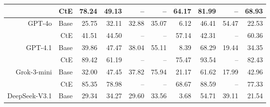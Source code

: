 \begin{table}[!t]
\begin{tabular}{r r !{\color{white!80!black} \vline} r r r r r !{\color{white!80!black} \vline} r r r}
 & CtE & \textcolor{blue!60!black}{78.24} & \textcolor{blue!60!black}{49.13} & \textcolor{blue!60!black}{--} & \textcolor{blue!60!black}{--} & \textcolor{blue!60!black}{64.17} & \textcolor{blue!60!black}{81.99} & \textcolor{blue!60!black}{--} & \textcolor{blue!60!black}{68.93} \\ \midrule
 \sf GPT-4o & Base & \textcolor{blue!60!black}{25.75} & \textcolor{blue!60!black}{32.11} & \textcolor{blue!60!black}{32.88} & \textcolor{blue!60!black}{35.07} & \textcolor{blue!60!black}{6.12} & \textcolor{blue!60!black}{46.41} & \textcolor{blue!60!black}{54.47} & \textcolor{blue!60!black}{22.53} \\
 & CtE & \textcolor{blue!60!black}{41.51} & \textcolor{blue!60!black}{44.50} & \textcolor{blue!60!black}{--} & \textcolor{blue!60!black}{--} & \textcolor{blue!60!black}{57.14} & \textcolor{blue!60!black}{42.31} & \textcolor{blue!60!black}{--} & \textcolor{blue!60!black}{60.36} \\ \midrule
 \sf GPT-4.1 & Base & \textcolor{blue!60!black}{39.86} & \textcolor{blue!60!black}{47.47} & \textcolor{blue!60!black}{38.04} & \textcolor{blue!60!black}{55.11} & \textcolor{blue!60!black}{8.39} & \textcolor{blue!60!black}{68.29} & \textcolor{blue!60!black}{19.44} & \textcolor{blue!60!black}{34.35} \\
 & CtE & \textcolor{blue!60!black}{89.42} & \textcolor{blue!60!black}{61.19} & \textcolor{blue!60!black}{--} & \textcolor{blue!60!black}{--} & \textcolor{blue!60!black}{75.47} & \textcolor{blue!60!black}{93.54} & \textcolor{blue!60!black}{--} & \textcolor{blue!60!black}{82.43} \\ \midrule
 \sf Grok-3-mini & Base & \textcolor{blue!60!black}{32.00} & \textcolor{blue!60!black}{47.45} & \textcolor{blue!60!black}{37.82} & \textcolor{blue!60!black}{75.94} & \textcolor{blue!60!black}{21.17} & \textcolor{blue!60!black}{61.62} & \textcolor{blue!60!black}{17.99} & \textcolor{blue!60!black}{42.96} \\
 & CtE & \textcolor{blue!60!black}{85.35} & \textcolor{blue!60!black}{78.98} & \textcolor{blue!60!black}{--} & \textcolor{blue!60!black}{--} & \textcolor{blue!60!black}{68.67} & \textcolor{blue!60!black}{88.59} & \textcolor{blue!60!black}{--} & \textcolor{blue!60!black}{77.33} \\ \midrule
 \sf DeepSeek-V3.1 & Base & \textcolor{blue!60!black}{29.34} & \textcolor{blue!60!black}{34.27} & \textcolor{blue!60!black}{29.60} & \textcolor{blue!60!black}{33.56} & \textcolor{blue!60!black}{3.68} & \textcolor{blue!60!black}{54.71} & \textcolor{blue!60!black}{39.11} & \textcolor{blue!60!black}{21.54} \\

\end{tabular}
\end{table}
